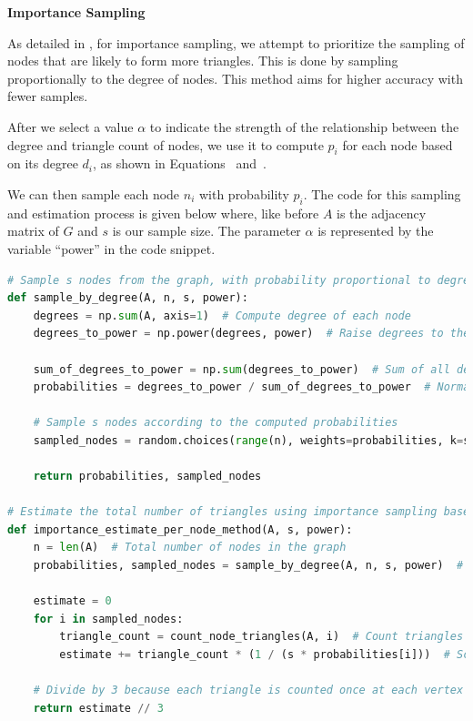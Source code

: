 \documentclass[11pt, margin=1in]{article}
\begin{document}
\textbf{Importance Sampling}

As detailed in , for importance sampling, we attempt to prioritize the sampling of nodes that are likely to form more triangles.
This is done by sampling proportionally to the degree of nodes.
This method aims for higher accuracy with fewer samples.

After we select a value $\alpha$ to indicate the strength of the relationship between the degree and triangle count of nodes, we use it to compute $p_i$ for each node based on its degree $d_i$, as shown in Equations~ and~.

We can then sample each node $n_i$ with probability $p_i$.
The code for this sampling and estimation process is given below where, like before $A$ is the adjacency matrix of $G$ and $s$ is our sample size.
The parameter $\alpha$ is represented by the variable ``power'' in the code snippet.

{
\singlespacing
\begin{lstlisting}[language=Python]
# Sample s nodes from the graph, with probability proportional to degree^power
def sample_by_degree(A, n, s, power):
    degrees = np.sum(A, axis=1)  # Compute degree of each node
    degrees_to_power = np.power(degrees, power)  # Raise degrees to the given power

    sum_of_degrees_to_power = np.sum(degrees_to_power)  # Sum of all degrees^power
    probabilities = degrees_to_power / sum_of_degrees_to_power  # Normalize to get probabilities

    # Sample s nodes according to the computed probabilities
    sampled_nodes = random.choices(range(n), weights=probabilities, k=s)

    return probabilities, sampled_nodes

# Estimate the total number of triangles using importance sampling based on degree
def importance_estimate_per_node_method(A, s, power):
    n = len(A)  # Total number of nodes in the graph
    probabilities, sampled_nodes = sample_by_degree(A, n, s, power)  # Sample nodes with importance weights

    estimate = 0
    for i in sampled_nodes:
        triangle_count = count_node_triangles(A, i)  # Count triangles involving node i
        estimate += triangle_count * (1 / (s * probabilities[i]))  # Scale by inverse sampling probability

    # Divide by 3 because each triangle is counted once at each vertex
    return estimate // 3
\end{lstlisting}
}
\end{document}

